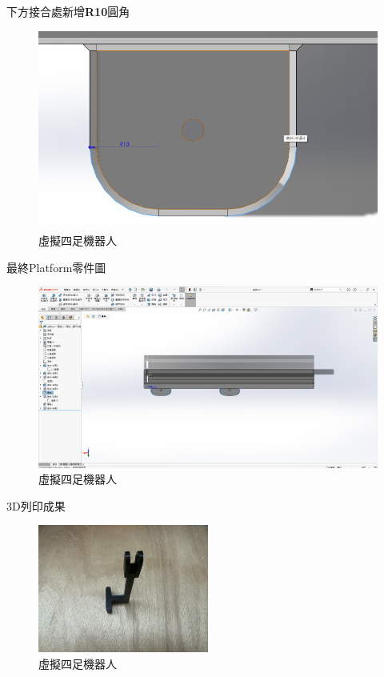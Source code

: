 \noindent 下方接合處新增\textbf{R10}圓角

\begin{figure}[h!]
    \centering
    \includegraphics[width=1\textwidth]{./../images/6-1-21.png}
    \caption{\Large 虛擬四足機器人}
\end{figure}

\noindent 最終Platform零件圖

\begin{figure}[h!]
    \centering
    \includegraphics[width=1\textwidth]{./../images/6-1-22.png}
    \caption{\Large 虛擬四足機器人}
\end{figure}

\noindent 3D列印成果

\begin{figure}[h!]
    \centering
    \includegraphics[width=0.5\textwidth]{./../images/6-1-24.JPG}
    \caption{\Large 虛擬四足機器人}
\end{figure}


